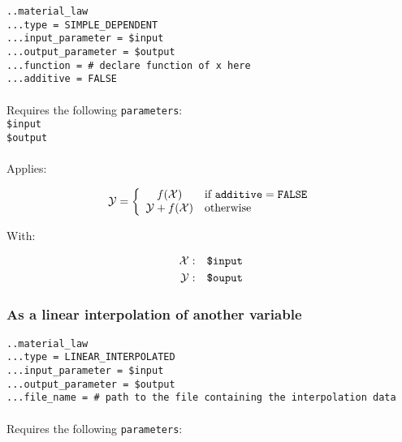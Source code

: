 \documentclass[10pt]{article}
\begin{document}
\noindent \verb+..material_law+\\
\verb+...type = SIMPLE_DEPENDENT+\\
\verb+...input_parameter = $input+\\
\verb+...output_parameter = $output+\\
\verb+...function = # declare function of x here+\\
\verb+...additive = FALSE+

\paragraph{}Requires the following \verb+parameters+:\\

\noindent \verb+$input+\\
\verb+$output+

\paragraph{}Applies:

\begin{equation}
	\mathcal{Y} = \left\{ \begin{array}{cl} f(\mathcal{X}) & \text{if }\verb+additive+ = \verb+FALSE+  \\ \mathcal{Y}+f(\mathcal{X}) & \text{otherwise} \end{array} \right.
\end{equation}

With:

\begin{eqnarray}
	\mathcal{X} & : & \verb+$input+ \notag \\
	\mathcal{Y} & : & \verb+$ouput+\notag  
\end{eqnarray}

\subsubsection{As a linear interpolation of another variable}

\noindent \verb+..material_law+\\
\verb+...type = LINEAR_INTERPOLATED+\\
\verb+...input_parameter = $input+\\
\verb+...output_parameter = $output+\\
\verb+...file_name = # path to the file containing the interpolation data+

\paragraph{}Requires the following \verb+parameters+:\\
\end{document}
